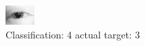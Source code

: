 \begin{figure}[h!]
\begin{center}
\includegraphics[width=0.60\columnwidth]{figures/ID77_class_4_target_3.png}
\end{center}
\caption{ Classification: 4 actual target: 3}
\label{fig:ID77_class_4_target_3}
\end{figure}
